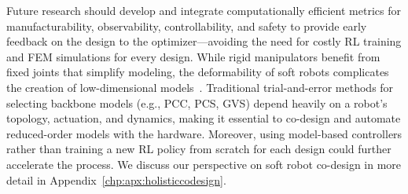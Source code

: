 Future research should develop and integrate computationally efficient metrics for manufacturability, observability, controllability, and safety to provide early feedback on the design to the optimizer—avoiding the need for costly \gls{RL} training and \gls{FEM} simulations for every design. While rigid manipulators benefit from fixed joints that simplify modeling, the deformability of soft robots complicates the creation of low-dimensional models~\citep{armanini2023soft}. Traditional trial-and-error methods for selecting backbone models (e.g., \gls{PCC}, \gls{PCS}, \gls{GVS}) depend heavily on a robot’s topology, actuation, and dynamics, making it essential to co-design and automate reduced-order models with the hardware. Moreover, using model-based controllers rather than training a new \gls{RL} policy from scratch for each design could further accelerate the process. We discuss our perspective on soft robot co-design in more detail in Appendix~\ref{chp:apx:holisticcodesign}.

